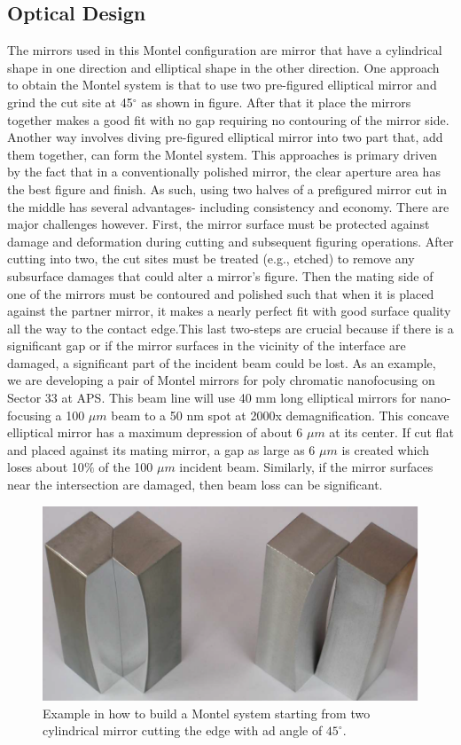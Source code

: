 \subsection{Optical Design \cite{ice2009nested}}
The mirrors used in this Montel configuration are mirror that have a cylindrical shape in one direction and elliptical shape in the other direction. One approach to obtain the Montel system is that to use two pre-figured elliptical mirror and grind the cut site at 45$^\circ $ as shown in figure. After that it place the mirrors together makes a good fit with no gap requiring no contouring of the mirror side. Another way involves diving pre-figured elliptical mirror into two part that, add them together, can form the Montel system. This approaches is primary driven by the fact that in a conventionally polished mirror, the clear aperture area has the best figure and finish. As such, using two halves of a prefigured mirror cut in the middle has several advantages- including consistency and economy. There are major challenges
however. First, the mirror surface must be protected against damage and deformation during cutting and subsequent figuring operations. After cutting into two, the cut sites must be treated (e.g., etched) to remove any subsurface damages that could alter a mirror's figure. Then the mating side of one of the mirrors must be contoured and polished such that when it is placed against the partner mirror, it makes a nearly perfect fit with good surface quality all the way to the contact edge.This last two-steps are crucial because if there is a significant gap or if the mirror surfaces in the vicinity of the interface are damaged, a significant part of the incident beam could be lost. As an example, we are developing a pair of Montel mirrors for poly chromatic nanofocusing on Sector 33 at APS. This beam line will use 40 mm long elliptical mirrors for nano-focusing a 100 $\mu m$ beam to a 50 nm spot at 2000x demagnification. This concave elliptical mirror has a maximum depression of about 6 $\mu m$ at its center. If cut flat and placed against its mating mirror, a gap as large as 6 $\mu m$ is created which loses about 10$\% $ of the 100 $\mu m$ incident beam. Similarly, if the mirror surfaces near the intersection are damaged, then beam loss can be significant.
\begin{figure}[]
%
\centering
%
\includegraphics[width=.8\textwidth]{Immagini/Chapter2/MontelEdges}
%
\caption{Example in how to build a Montel system starting from two cylindrical mirror cutting the edge with ad angle of $45^{\circ} $.}
%
\label{fig: MontelEdges}
%
\end{figure}
